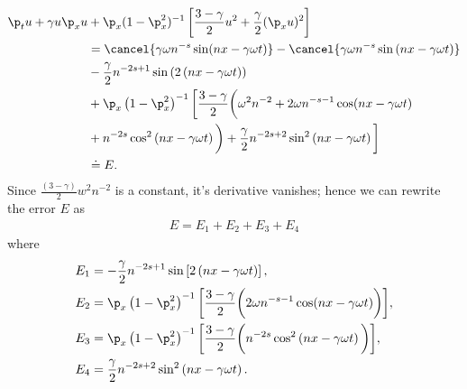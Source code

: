 	\begin{equation}
		\begin{split}
			\p_t u + \gamma u \p_x u
			& + \p_x(1- \p_x^2)^{-1} \left[
			\frac{3-\gamma}{2}u^2 + \frac{\gamma}{2}(\p_x u)^2 \right]
			\\
			& = \cancel{\gamma \omega n^{-s} \sin(nx - \gamma \omega t)} -
			\cancel{\gamma \omega n^{-s}\sin\left( nx - \gamma \omega t \right)}
			\\
			& -
			\frac{\gamma}{2}n^{-2s+1}\sin\left( 2\left( nx - \gamma \omega t \right)
			\right)
			\\
			& + \p_x \left( 1-\p_x^2 \right)^{-1}\bigg[ \frac{3-\gamma}{2} \bigg (
			\omega^2 n^{-2} + 2 \omega n^{-s -1}\cos( nx - \gamma \omega t )
			\\
			& + n^{-2s}\cos^2\left( nx - \gamma \omega t \right) \bigg ) + \frac{\gamma}{2}
			n^{-2s+2}\sin^2\left( nx - \gamma \omega t \right)
			\bigg]
			\\
			& \doteq E.
			\label{functional-representation-of-error}
		\end{split}
	\end{equation}
	Since $\frac{(3-\gamma)}{2}w^2 n^{-2}$ is a constant, it's derivative vanishes;
	hence we can rewrite the error $E$ as
	\begin{equation}
		\begin{split}
			E= E_1 + E_2 + E_3 + E_4
			\label{57}
		\end{split}
	\end{equation}
	where
	\begin{align}
		\label{90*}
			& E_1 =
			- \frac{\gamma}{2}n^{-2s+1}\sin\left[ 2\left( nx - \gamma 
			\omega t \right)
			\right],
			\\
			\label{90**}
			& E_2 = \p_x \left( 1-\p_x^2 \right)^{-1}\bigg[ \frac{3-\gamma}{2} \bigg (
			2 \omega n^{-s -1}\cos( nx - \gamma \omega t )
			\bigg )
			\bigg ],
			\\
			\label{90***}
			& E_3 = \p_x \left( 1-\p_x^2 \right)^{-1}\bigg[ 
			\frac{3-\gamma}{2} \bigg (
			 n^{-2s}\cos^2\left( nx - \gamma \omega t \right) \bigg )
			\bigg ],
			\\
			& E_4 = \frac{\gamma}{2}
			n^{-2s+2}\sin^2\left( nx - \gamma \omega t \right).
			\label{90}
	\end{align}
%
%
%
\noindent
